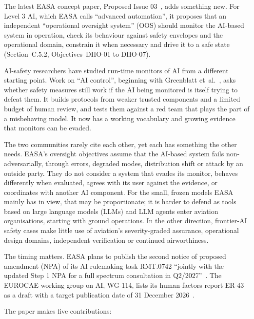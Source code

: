 \documentclass[11pt]{article}
\begin{document}
The latest EASA concept paper, Proposed Issue 03~\cite{easa2026concept}, adds something new. For Level 3 AI, which EASA calls ``advanced automation'', it proposes that an independent ``operational oversight system'' (OOS) should monitor the AI-based system in operation, check its behaviour against safety envelopes and the operational domain, constrain it when necessary and drive it to a safe state (Section~C.5.2, Objectives~DHO-01 to DHO-07).

AI-safety researchers have studied run-time monitors of AI from a different starting point. Work on ``AI control'', beginning with Greenblatt et~al.~\cite{greenblatt2023control}, asks whether safety measures still work if the AI being monitored is itself trying to defeat them. It builds protocols from weaker trusted components and a limited budget of human review, and tests them against a red team that plays the part of a misbehaving model. It now has a working vocabulary and growing evidence that monitors can be evaded.

The two communities rarely cite each other, yet each has something the other needs. EASA's oversight objectives assume that the AI-based system fails non-adversarially, through errors, degraded modes, distribution shift or attack by an outside party. They do not consider a system that evades its monitor, behaves differently when evaluated, agrees with its user against the evidence, or coordinates with another AI component. For the small, frozen models EASA mainly has in view, that may be proportionate; it is harder to defend as tools based on large language models (LLMs) and LLM agents enter aviation organisations, starting with ground operations. In the other direction, frontier-AI safety cases make little use of aviation's severity-graded assurance, operational design domains, independent verification or continued airworthiness.

The timing matters. EASA plans to publish the second notice of proposed amendment (NPA) of its AI rulemaking task RMT.0742 ``jointly with the updated Step 1 NPA for a full spectrum consultation in Q2/2027''~\cite[slide~17]{easa2026aidays}. The EUROCAE working group on AI, WG-114, lists its human-factors report ER-43 as a draft with a target publication date of 31 December 2026~\cite{eurocaewg114}.

The paper makes five contributions:
\end{document}
